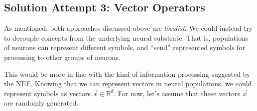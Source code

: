 \documentclass[10pt,letterpaper,oneside]{article}
\begin{document}
\subsection{Solution Attempt 3: Vector Operators}

As mentioned, both approaches discussed above are \emph{localist}. We could instead try to decouple concepts from the underlying neural substrate. That is, populations of neurons can represent different symbols, and \enquote{send} represented symbols for processing to other groups of neurons.

This would be more in line with the kind of information processing suggested by the NEF. Knowing that we can represent vectors in neural populations, we could represent symbols as vectors $\vec x \in \mathbb{R}^d$. For now, let's assume that these vectors $\vec x$ are randomly generated.
\end{document}
